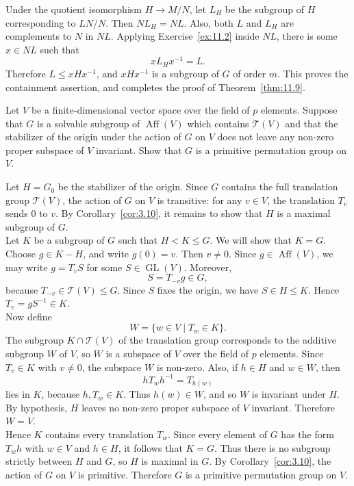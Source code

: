 \documentclass[../Odyssey_Project.tex]{subfiles}
\begin{document}
\begin{solution}
    Under the quotient isomorphism $H\to M/N$, let $L_H$ be the subgroup of $H$ corresponding to $LN/N$. Then $NL_H=NL$. Also, both $L$ and $L_H$ are complements to $N$ in $NL$. Applying Exercise~\ref{ex:11.2} inside $NL$, there is some $x\in NL$ such that
    \[
        xL_Hx^{-1}=L.
    \]
    Therefore $L\leq xHx^{-1}$, and $xHx^{-1}$ is a subgroup of $G$ of order $m$. This proves the containment assertion, and completes the proof of Theorem~\ref{thm:11.9}.
\end{solution}

\begin{exercise}
\label{ex:11.5}
Let $V$ be a finite-dimensional vector space over the field of $p$ elements. Suppose that $G$ is a solvable subgroup of $\operatorname{Aff}(V)$ which contains $\mathcal{T}(V)$ and that the stabilizer of the origin under the action of $G$ on $V$ does not leave any non-zero proper subspace of $V$ invariant. Show that $G$ is a primitive permutation group on $V$.
\end{exercise}
\begin{solution}
    Let $H=G_0$ be the stabilizer of the origin. Since $G$ contains the full translation group $\mathcal{T}(V)$, the action of $G$ on $V$ is transitive: for any $v\in V$, the translation $T_v$ sends $0$ to $v$. By Corollary~\ref{cor:3.10}, it remains to show that $H$ is a maximal subgroup of $G$.\\
    Let $K$ be a subgroup of $G$ such that $H<K\leq G$. We will show that $K=G$. Choose $g\in K-H$, and write $g(0)=v$. Then $v\neq 0$. Since $g\in \operatorname{Aff}(V)$, we may write $g=T_vS$ for some $S\in \operatorname{GL}(V)$. Moreover,
    \[
        S=T_{-v}g\in G,
    \]
    because $T_{-v}\in\mathcal{T}(V)\leq G$. Since $S$ fixes the origin, we have $S\in H\leq K$. Hence $T_v=gS^{-1}\in K$.\\
    Now define
    \[
        W=\{w\in V\mid T_w\in K\}.
    \]
    The subgroup $K\cap\mathcal{T}(V)$ of the translation group corresponds to the additive subgroup $W$ of $V$, so $W$ is a subspace of $V$ over the field of $p$ elements. Since $T_v\in K$ with $v\neq 0$, the subspace $W$ is non-zero. Also, if $h\in H$ and $w\in W$, then
    \[
        hT_wh^{-1}=T_{h(w)}
    \]
    lies in $K$, because $h,T_w\in K$. Thus $h(w)\in W$, and so $W$ is invariant under $H$. By hypothesis, $H$ leaves no non-zero proper subspace of $V$ invariant. Therefore $W=V$.\\
    Hence $K$ contains every translation $T_w$. Since every element of $G$ has the form $T_w h$ with $w\in V$ and $h\in H$, it follows that $K=G$. Thus there is no subgroup strictly between $H$ and $G$, so $H$ is maximal in $G$. By Corollary~\ref{cor:3.10}, the action of $G$ on $V$ is primitive. Therefore $G$ is a primitive permutation group on $V$.
\end{solution}
\end{document}
